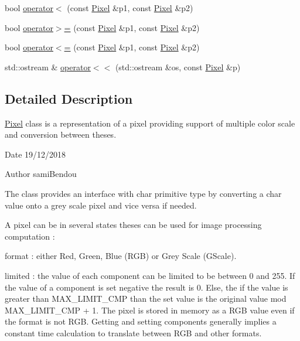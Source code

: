 \begin{DoxyCompactItemize}
\item 
bool \mbox{\hyperlink{class_pixel_a6cc03ea69b84151454e6cb42b066f3c6}{operator$<$}} (const \mbox{\hyperlink{class_pixel}{Pixel}} \&p1, const \mbox{\hyperlink{class_pixel}{Pixel}} \&p2)
\item 
bool \mbox{\hyperlink{class_pixel_a9564c5098775053d65c9f052b9281388}{operator$>$=}} (const \mbox{\hyperlink{class_pixel}{Pixel}} \&p1, const \mbox{\hyperlink{class_pixel}{Pixel}} \&p2)
\item 
bool \mbox{\hyperlink{class_pixel_a8e1356c4b2066282783d0c03526bd34f}{operator$<$=}} (const \mbox{\hyperlink{class_pixel}{Pixel}} \&p1, const \mbox{\hyperlink{class_pixel}{Pixel}} \&p2)
\item 
std\+::ostream \& \mbox{\hyperlink{class_pixel_af9850b2e5c78fc7f7e841c490713168e}{operator$<$$<$}} (std\+::ostream \&os, const \mbox{\hyperlink{class_pixel}{Pixel}} \&p)
\end{DoxyCompactItemize}


\subsection{Detailed Description}
\mbox{\hyperlink{class_pixel}{Pixel}} class is a representation of a pixel providing support of multiple color scale and conversion between theses. 

\begin{DoxyDate}{Date}
19/12/2018 
\end{DoxyDate}
\begin{DoxyAuthor}{Author}
sami\+Bendou
\end{DoxyAuthor}
The class provides an interface with char primitive type by converting a char value onto a grey scale pixel and vice versa if needed.

A pixel can be in several states theses can be used for image processing computation \+:
\begin{DoxyItemize}
\item format \+: either Red, Green, Blue (R\+GB) or Grey Scale (G\+Scale).
\item limited \+: the value of each component can be limited to be between 0 and 255. If the value of a component is set negative the result is 0. Else, the if the value is greater than M\+A\+X\+\_\+\+L\+I\+M\+I\+T\+\_\+\+C\+MP than the set value is the original value mod {\ttfamily M\+A\+X\+\_\+\+L\+I\+M\+I\+T\+\_\+\+C\+MP + 1}. The pixel is stored in memory as a R\+GB value even if the format is not R\+GB. Getting and setting components generally implies a constant time calculation to translate between R\+GB and other formats. 
\end{DoxyItemize}

